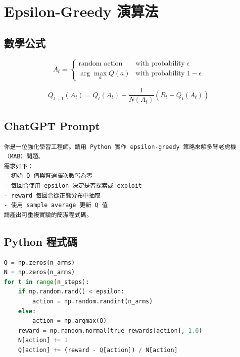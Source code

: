 \documentclass{article}
\begin{document}
\newpage
\section{Epsilon-Greedy 演算法}

\subsection*{數學公式}
\begin{equation*}
A_t = \begin{cases}
    \text{random action} & \text{with probability } \epsilon \\
    \arg\max_a Q(a) & \text{with probability } 1 - \epsilon
\end{cases}
\end{equation*}

\begin{equation*}
Q_{t+1}(A_t) = Q_t(A_t) + \frac{1}{N(A_t)}(R_t - Q_t(A_t))
\end{equation*}

\subsection*{ChatGPT Prompt}
\begin{verbatim}
你是一位強化學習工程師。請用 Python 實作 epsilon-greedy 策略來解多臂老虎機（MAB）問題。
需求如下：
- 初始 Q 值與臂選擇次數皆為零
- 每回合使用 epsilon 決定是否探索或 exploit
- reward 每回合從正態分布中抽取
- 使用 sample average 更新 Q 值
請產出可重複實驗的簡潔程式碼。

\end{verbatim}

\subsection*{Python 程式碼}
\begin{lstlisting}[language=Python]
Q = np.zeros(n_arms)
N = np.zeros(n_arms)
for t in range(n_steps):
    if np.random.rand() < epsilon:
        action = np.random.randint(n_arms)
    else:
        action = np.argmax(Q)
    reward = np.random.normal(true_rewards[action], 1.0)
    N[action] += 1
    Q[action] += (reward - Q[action]) / N[action]
\end{lstlisting}
\end{document}
